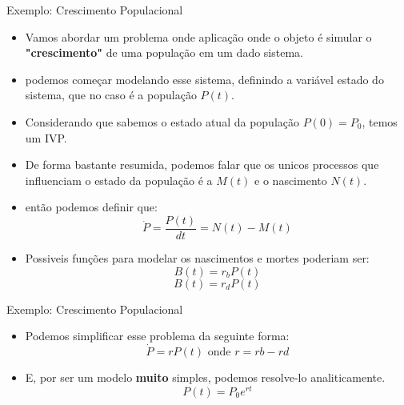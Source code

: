 \documentclass{beamer}
\begin{document}
		\begin{frame}{Exemplo: Crescimento Populacional}
			\begin{itemize}[<+->]
				\item Vamos abordar um problema onde aplicação onde o objeto é simular o \textbf{"crescimento"} de uma população em um dado sistema.
				\item podemos começar modelando esse sistema, definindo a variável estado do sistema, que no caso é a população $P(t)$.
				\item Considerando que sabemos o estado atual da população $P(0)=P_0$, temos um IVP.
				\item De forma bastante resumida, podemos falar que os unicos processos que influenciam o estado da população é a $M(t)$ e o nascimento $N(t)$.
				\item então podemos definir que:
					\begin{equation}
						\dot{P}= \frac{P(t)}{dt} = N(t)-M(t)
					\end{equation}
				\item Possiveis funções para modelar os nascimentos e mortes poderiam ser:
					\begin{equation}
						B(t)=r_bP(t)
					\end{equation}
					\begin{equation}
						B(t)=r_dP(t)
					\end{equation}
			\end{itemize}
		\end{frame}
		\begin{frame}{Exemplo: Crescimento Populacional}
			\begin{itemize}[<+->]
				\item Podemos simplificar esse problema da seguinte forma:
					\begin{equation}
						\dot{P}=rP(t) \text{ onde } r=rb-rd
					\end{equation}
				\item E, por ser um modelo \textbf{muito} simples, podemos resolve-lo analiticamente.
					\begin{equation}
						P(t)=P_0e^{rt}
					\end{equation}
			\end{itemize}
		\end{frame}
\end{document}
